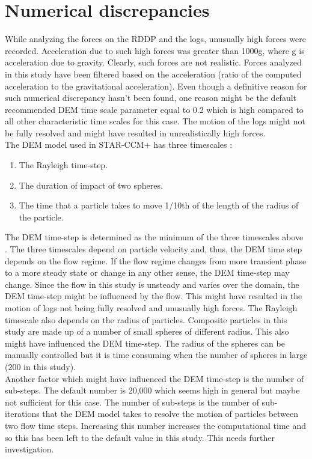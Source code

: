 \FloatBarrier
\section{Numerical discrepancies}
While analyzing the forces on the RDDP and the logs, unusually high forces were recorded. Acceleration due to such high forces was greater than 1000g, where g is acceleration due to gravity. Clearly, such forces are not realistic. Forces analyzed in this study have been filtered based on the acceleration (ratio of the computed acceleration to the gravitational acceleration). Even though a definitive reason for such numerical discrepancy hasn't been found, one reason might be the default recommended DEM time scale parameter equal to 0.2%
which is high compared to all other characteristic time scales for this case. The motion of the logs might not be fully resolved and might have resulted in unrealistically high forces.\\
The DEM model used in STAR-CCM+ has three timescales \cite{DEMTimeStep}:
\begin{enumerate}
\item The Rayleigh time-step.
\item The duration of impact of two spheres.
\item The time that a particle takes to move 1/10th of the length of the radius of the particle. 
\end{enumerate}
The DEM time-step is determined as the minimum of the three timescales above \cite{DEMTimeStep}. The three timescales depend on particle velocity and, thus, the DEM time step depends on the flow regime. If the flow regime changes from more transient phase to a more  steady state or change in any other sense, the DEM time-step may change. Since the flow in this study is unsteady and varies over the domain, the DEM time-step might be influenced by the flow. This might have resulted in the motion of logs not being fully resolved and  unusually high  forces. The Rayleigh timescale also depends on the radius of particles. Composite particles in this study are made up of a number of small spheres of different radius. This also might have influenced the DEM time-step. The radius of the spheres can be manually controlled but it is time consuming when the number of spheres in large (200 in this study).\\
Another factor which might have influenced the DEM time-step is the number of sub-steps. The default number is 20,000 which seems high in general but maybe not sufficient for this case. The number of sub-steps is the number of sub-iterations that the DEM model takes to resolve the motion of particles between two flow time steps. Increasing this number increases the computational time and so this has been left to the default value in this study. This needs further investigation.\\
